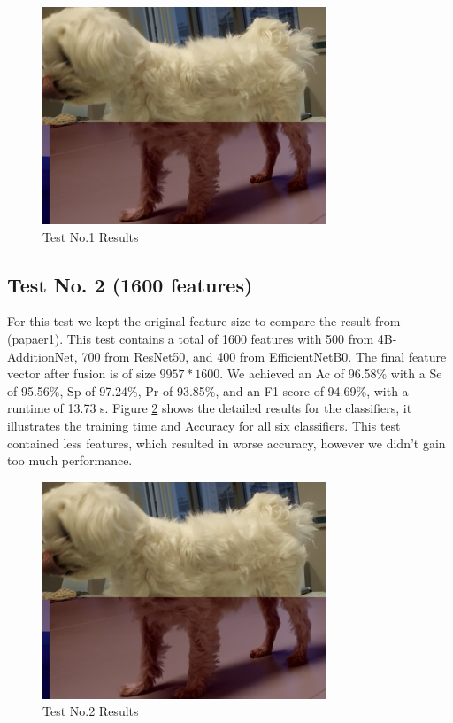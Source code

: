 \documentclass[conference]{IEEEtran}
\begin{document}
\begin{figure}[htbp]
    \begin{center}
    \includegraphics[scale=0.2]{test1.png}
    \end{center}
    \caption{Test No.1 Results}
    \label{test1}
\end{figure}

\subsection{Test No. 2 (1600 features)}

For this test we kept the original feature size to compare the result from (papaer1).
This test contains a total of 1600 features with 500 from 4B-AdditionNet, 700 from ResNet50, and 400 from EfficientNetB0. 
The final feature vector after fusion is of size $9957*1600$.
We achieved an Ac of 96.58\% with a Se of 95.56\%, Sp of 97.24\%, Pr of 93.85\%, and an F1 score of 94.69\%, with a runtime of 13.73 s. 
Figure \ref{test1} shows the detailed results for the classifiers, it illustrates the training time and Accuracy for all six classifiers.
This test contained less features, which resulted in worse accuracy, however we didn't gain too much performance.

\begin{figure}[htbp]
    \begin{center}
    \includegraphics[scale=0.3]{test1.png}
    \end{center}
    \caption{Test No.2 Results}
    \label{test1}
\end{figure}
\end{document}
